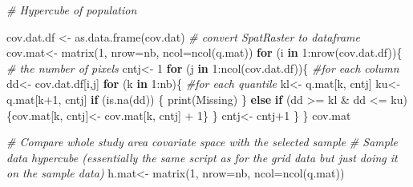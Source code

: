\documentclass[
]{book}
\newenvironment{Shaded}{\begin{snugshade}}{\end{snugshade}}
\newcommand{\AttributeTok}[1]{\textcolor[rgb]{0.77,0.63,0.00}{#1}}
\newcommand{\CommentTok}[1]{\textcolor[rgb]{0.56,0.35,0.01}{\textit{#1}}}
\newcommand{\ControlFlowTok}[1]{\textcolor[rgb]{0.13,0.29,0.53}{\textbf{#1}}}
\newcommand{\DecValTok}[1]{\textcolor[rgb]{0.00,0.00,0.81}{#1}}
\newcommand{\FunctionTok}[1]{\textcolor[rgb]{0.00,0.00,0.00}{#1}}
\newcommand{\NormalTok}[1]{#1}
\newcommand{\OtherTok}[1]{\textcolor[rgb]{0.56,0.35,0.01}{#1}}
\newcommand{\SpecialCharTok}[1]{\textcolor[rgb]{0.00,0.00,0.00}{#1}}
\newcommand{\StringTok}[1]{\textcolor[rgb]{0.31,0.60,0.02}{#1}}
\begin{document}
\begin{Shaded}
\begin{Highlighting}[]
    \CommentTok{\# Hypercube of population}
    
\NormalTok{    cov.dat.df }\OtherTok{\textless{}{-}} \FunctionTok{as.data.frame}\NormalTok{(cov.dat) }\CommentTok{\# convert SpatRaster to dataframe}
\NormalTok{    cov.mat}\OtherTok{\textless{}{-}} \FunctionTok{matrix}\NormalTok{(}\DecValTok{1}\NormalTok{, }\AttributeTok{nrow=}\NormalTok{nb, }\AttributeTok{ncol=}\FunctionTok{ncol}\NormalTok{(q.mat))}
    \ControlFlowTok{for}\NormalTok{ (i }\ControlFlowTok{in} \DecValTok{1}\SpecialCharTok{:}\FunctionTok{nrow}\NormalTok{(cov.dat.df))\{ }\CommentTok{\# the number of pixels}
\NormalTok{      cntj}\OtherTok{\textless{}{-}} \DecValTok{1} 
      \ControlFlowTok{for}\NormalTok{ (j }\ControlFlowTok{in} \DecValTok{1}\SpecialCharTok{:}\FunctionTok{ncol}\NormalTok{(cov.dat.df))\{ }\CommentTok{\#for each column}
\NormalTok{        dd}\OtherTok{\textless{}{-}}\NormalTok{ cov.dat.df[i,j]  }
        \ControlFlowTok{for}\NormalTok{ (k }\ControlFlowTok{in} \DecValTok{1}\SpecialCharTok{:}\NormalTok{nb)\{  }\CommentTok{\#for each quantile}
\NormalTok{          kl}\OtherTok{\textless{}{-}}\NormalTok{ q.mat[k, cntj] }
\NormalTok{          ku}\OtherTok{\textless{}{-}}\NormalTok{ q.mat[k}\SpecialCharTok{+}\DecValTok{1}\NormalTok{, cntj] }
          \ControlFlowTok{if}\NormalTok{ (}\FunctionTok{is.na}\NormalTok{(dd)) \{}
            \FunctionTok{print}\NormalTok{(}\StringTok{\textquotesingle{}Missing\textquotesingle{}}\NormalTok{)}
\NormalTok{          \}}
          \ControlFlowTok{else} \ControlFlowTok{if}\NormalTok{ (dd }\SpecialCharTok{\textgreater{}=}\NormalTok{ kl }\SpecialCharTok{\&}\NormalTok{ dd }\SpecialCharTok{\textless{}=}\NormalTok{ ku)\{cov.mat[k, cntj]}\OtherTok{\textless{}{-}}\NormalTok{ cov.mat[k, cntj] }\SpecialCharTok{+} \DecValTok{1}\NormalTok{\} }
\NormalTok{        \}}
\NormalTok{        cntj}\OtherTok{\textless{}{-}}\NormalTok{ cntj}\SpecialCharTok{+}\DecValTok{1}
\NormalTok{      \}}
\NormalTok{    \}}
\NormalTok{    cov.mat}
    
    
    \CommentTok{\# Compare whole study area covariate space with the selected sample}
    \CommentTok{\# Sample data hypercube (essentially the same script as for the grid data but just doing it on the sample data)}
\NormalTok{    h.mat}\OtherTok{\textless{}{-}} \FunctionTok{matrix}\NormalTok{(}\DecValTok{1}\NormalTok{, }\AttributeTok{nrow=}\NormalTok{nb, }\AttributeTok{ncol=}\FunctionTok{ncol}\NormalTok{(q.mat))}
    

\end{Highlighting}
\end{Shaded}
\end{document}
